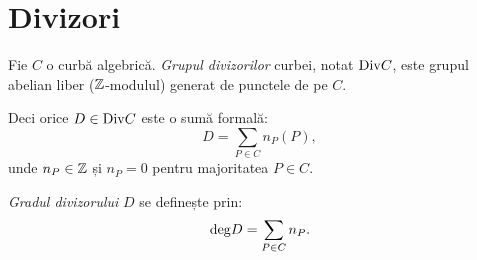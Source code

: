 
\section{Divizori}

\begin{definition}\label{def:divizor}
  Fie $ C $ o curbă algebrică. \emph{Grupul divizorilor} curbei, notat
  $ \mathrm{Div}C $, este grupul abelian liber ($ \mathbb{Z} $-modulul) generat de
  punctele de pe $ C $.

  Deci orice $ D \in \mathrm{Div}C $ este o sumă formală:
  \[
    D = \sum_{P \in C} n_P(P),
  \]
  unde $ n_P \in \mathbb{Z} $ și $ n_P = 0 $ pentru majoritatea $ P \in C $.

  \emph{Gradul divizorului} $ D $ se definește prin:
  \[
    \mathrm{deg} D = \sum_{P \in C} n_P.
  \]
\end{definition}

